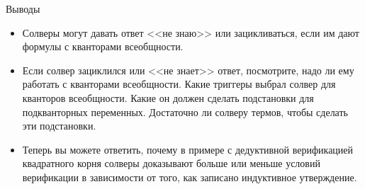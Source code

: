 \documentclass[hyperref={unicode=true}]{beamer}
\begin{document}
    \begin{frame}{Выводы}
    \begin{itemize}
    \item
    Солверы могут давать ответ <<не знаю>> или зацикливаться, если
    им дают формулы с кванторами всеобщности.
    \item
    Если солвер зациклился или <<не знает>> ответ, посмотрите,
    надо ли ему работать с кванторами всеобщности. Какие триггеры выбрал
    солвер для кванторов всеобщности. Какие он должен сделать подстановки
    для подкванторных переменных. Достаточно ли солверу термов, чтобы
    сделать эти подстановки.
    \item
    Теперь вы можете ответить, почему в примере с дедуктивной верификацией
    квадратного корня солверы доказывают больше или меньше
    условий верификации в зависимости от того, как записано
    индуктивное утверждение.
    \end{itemize}
    \end{frame}
\end{document}
